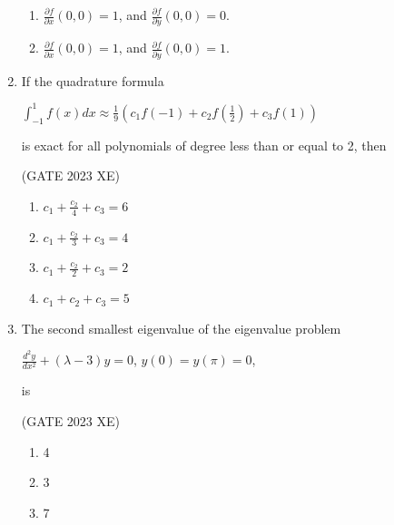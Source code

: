 \documentclass[journal,12pt,onecolumn]{IEEEtran}
\begin{document}
\begin{enumerate}
\begin{multicols}{2}
\begin{enumerate}
\item $\frac{\partial f}{\partial x}(0,0) = 1$, and $\frac{\partial f}{\partial y}(0,0) = 0$.

\item $\frac{\partial f}{\partial x}(0,0) = 1$, and $\frac{\partial f}{\partial y}(0,0) = 1$.

\end{enumerate}

\end{multicols}

\item If the quadrature formula

$\int_{-1}^1 f(x) dx \approx \frac{1}{9}\left(c_1 f(-1) + c_2 f(\frac{1}{2}) + c_3 f(1)\right)$

is exact for all polynomials of degree less than or equal to 2, then

\hfill{(GATE 2023 XE)}

\begin{multicols}{2}

\begin{enumerate}

\item $c_1 + \frac{c_2}{4} + c_3 = 6$

\item $c_1 + \frac{c_2}{3} + c_3 = 4$

\item $c_1 + \frac{c_2}{2} + c_3 = 2$

\item $c_1 + c_2 + c_3 = 5$

\end{enumerate}

\end{multicols}

\item The second smallest eigenvalue of the eigenvalue problem

$\frac{d^2 y}{d x^2} + (\lambda - 3) y = 0$, $y(0) = y(\pi) = 0$,

is

\hfill{(GATE 2023 XE)}

\begin{multicols}{2}

\begin{enumerate}

\item 4

\item 3

\item 7


\end{enumerate}
\end{multicols}
\end{enumerate}
\end{document}
